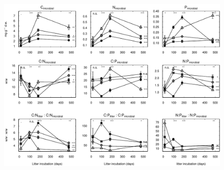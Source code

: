 \documentclass[10pt]{article}
\begin{document}
\begin{flushleft}
\begin{figure}[!ht]
\end{figure}
% 
\begin{figure}[!ht]
\begin{center}
\includegraphics{ligpaper-mb}
\end{center}
\end{figure}




\end{flushleft}
\end{document}
